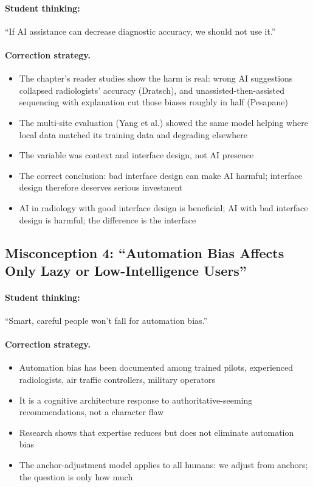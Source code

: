 \paragraph{Student thinking:} ``If AI assistance can decrease diagnostic accuracy, we should not use it.''

\paragraph{Correction strategy.}
\begin{itemize}
    \item The chapter's reader studies show the harm is real: wrong AI suggestions collapsed radiologists' accuracy (Dratsch), and unassisted-then-assisted sequencing with explanation cut those biases roughly in half (Pesapane)
    \item The multi-site evaluation (Yang et al.) showed the same model helping where local data matched its training data and degrading elsewhere
    \item The variable was context and interface design, not AI presence
    \item The correct conclusion: bad interface design can make AI harmful; interface design therefore deserves serious investment
    \item AI in radiology with good interface design is beneficial; AI with bad interface design is harmful; the difference is the interface
\end{itemize}

\subsection{Misconception 4: ``Automation Bias Affects Only Lazy or Low-Intelligence Users''}

\paragraph{Student thinking:} ``Smart, careful people won't fall for automation bias.''

\paragraph{Correction strategy.}
\begin{itemize}
    \item Automation bias has been documented among trained pilots, experienced radiologists, air traffic controllers, military operators
    \item It is a cognitive architecture response to authoritative-seeming recommendations, not a character flaw
    \item Research shows that expertise reduces but does not eliminate automation bias
    \item The anchor-adjustment model applies to all humans: we adjust from anchors; the question is only how much
\end{itemize}

